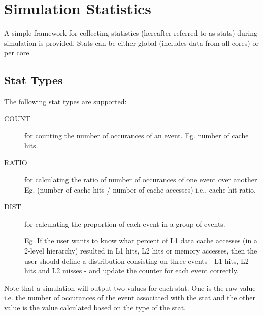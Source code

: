 

\chapter{Simulation Statistics}
\label{sec:stat}

A simple framework for collecting statistics (hereafter referred to as stats)
  during simulation is provided.  Stats can be either global (includes
      data from all cores) or per core.

\section{Stat Types}

The following stat types are supported:

\begin{description}

  \item [COUNT] for counting the number of occurances of an event. Eg. number
  of cache hits. 

  \item [RATIO] for calculating the ratio of number of occurances of one event
  over another. Eg. (number of cache hits / number of cache accesses) i.e.,
  cache hit ratio.

  \item [DIST]  for calculating the proportion of each event in a group of
  events.    Eg. If the user
      wants to know what percent of L1 data cache accesses (in a 2-level
          hierarchy) resulted in L1 hits, L2 hits or memory accesses, then the
      user should define a distribution consisting on three events - L1 hits,
      L2 hits and L2 misses  - and update the counter for each event correctly. 

\end{description}


Note that a simulation will output two values for each stat. One is the
raw value i.e. the number of occurances of the event associated with the
stat and the other value is the value calculated based on the type
of the stat.


